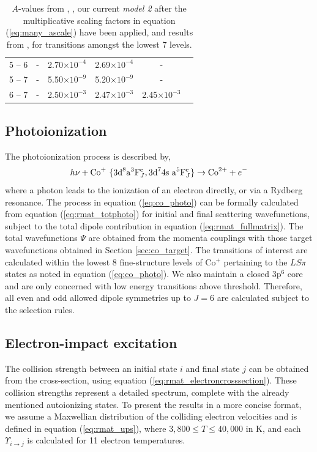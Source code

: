 \begin{table}[hbt!]
\begin{center}
\begin{tabular}{@{} l *5c @{}}
\multicolumn{1}{c}{  5 --  6}  & -    &  2.70$\times 10^{-4}$  &  2.69$\times 10^{-4}$  &  -   \\
\multicolumn{1}{c}{  5 --  7}  & -   &  5.50$\times 10^{-9}$    &  5.20$\times 10^{-9}$  &   -\\
\multicolumn{1}{c}{  6 -- 7} & -     &  2.50$\times 10^{-3}$    &  2.47$\times 10^{-3}$  &   2.45$\times 10^{-3}$ \\
      \hline
 \end{tabular}
 \caption{$A$-values from \citet{2016A&A...585A.121F}, \citet{1984ApJ...277..435H}, our current \textit{model 2} after the multiplicative scaling factors in equation (\ref{eq:many_ascale}) have been applied, and results from \citet{2016MNRAS.tmp..556S}, for transitions amongst the lowest 7 levels.  \label{tab:co_avalues}}
 \end{center}
 \end{table}
%	

\subsection{Photoionization}
The photoionization process is described by,
\begin{equation}\label{eq:co_photo}
h\nu + {\rm Co}^{+} ~ \{{\rm 3d}^8 {\rm a}^3{\rm F}^{{\rm e}}_J, {\rm 3d}^7 {\rm 4s~a}^5{\rm F}^{{\rm e}}_J\} \rightarrow {\rm Co}^{2+} + e^{{\rm -}}
\end{equation}
where a photon leads to the ionization of an electron directly, or via a Rydberg resonance. The process in equation (\ref{eq:co_photo}) can be formally calculated from equation (\ref{eq:rmat_totphoto}) for initial and final scattering wavefunctions, subject to the total dipole contribution in equation (\ref{eq:rmat_fullmatrix}). The total wavefunctions $\Psi$ are obtained from the momenta couplings with those target wavefunctions obtained in Section \ref{sec:co_target}. The transitions of interest are calculated within the lowest 8 fine-structure levels of Co$^{+}$ pertaining to the $LS\pi$ states as noted in equation (\ref{eq:co_photo}). We also maintain a closed 3p$^6$ core and are only concerned with low energy transitions above threshold. Therefore, all even and odd allowed dipole symmetries up to $J = 6$ are calculated subject to the selection rules.

\subsection{Electron-impact excitation}\label{sec:co_electron}
The collision strength between an initial state $i$ and final state $j$ can be obtained from the cross-section, using equation (\ref{eq:rmat_electroncrosssection}). These collision strengths represent a detailed spectrum, complete with the already mentioned autoionizing states. To present the results in a more concise format, we assume a Maxwellian distribution of the colliding electron velocities and is defined in equation (\ref{eq:rmat_ups}), where $3,800 \leq T \leq 40,000$ in K, and each $\Upsilon_{i \rightarrow j} $ is calculated for 11 electron temperatures.

